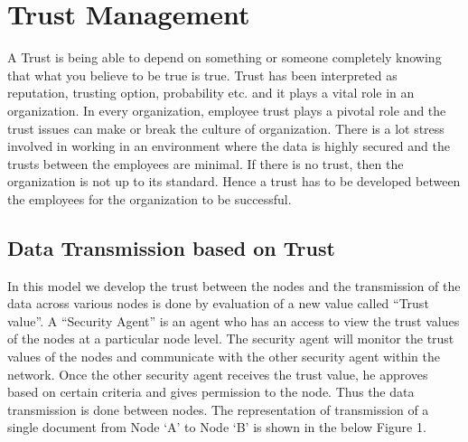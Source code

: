 \section{Trust Management}
\label{sec:trust-management}
A Trust is being able to depend on something or someone completely knowing that
what you believe to be true is true. Trust has been interpreted as reputation,
trusting option, probability etc. \autocite{Liu2006} and it plays a vital role in an
organization.  In every organization, employee trust plays a pivotal role and
the trust issues can make or break the culture of organization. There is a lot
stress involved in working in an environment where the data is highly secured
and the trusts between the employees are minimal.  If there is no trust, then
the organization is not up to its standard. Hence a trust has to be developed
between the employees for the organization to be successful. 

\subsection{Data Transmission based on Trust}
In this model we develop the trust between the nodes and the transmission of the
data across various nodes is done by evaluation of a new value called “Trust
value”. A “Security Agent” is an agent who has an access to view the trust
values of the nodes at a particular node level. The security agent will monitor
the trust values of the nodes and communicate with the other security agent
within the network. Once the other security agent receives the trust value, he
approves based on certain criteria and gives permission to the node. Thus the
data transmission is done between nodes. The representation of transmission of
a single document from Node ‘A' to Node ‘B' is shown in the below Figure 1.


